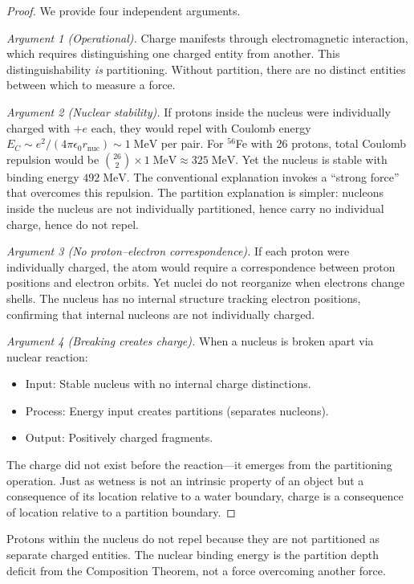 \begin{proof}
We provide four independent arguments.

\emph{Argument 1 (Operational).} Charge manifests through electromagnetic interaction, which requires distinguishing one charged entity from another. This distinguishability \emph{is} partitioning. Without partition, there are no distinct entities between which to measure a force.

\emph{Argument 2 (Nuclear stability).} If protons inside the nucleus were individually charged with $+e$ each, they would repel with Coulomb energy $E_C \sim e^2/(4\pi\epsilon_0 r_{\mathrm{nuc}}) \sim 1\;\mathrm{MeV}$ per pair. For $^{56}$Fe with 26 protons, total Coulomb repulsion would be $\binom{26}{2} \times 1\;\mathrm{MeV} \approx 325\;\mathrm{MeV}$. Yet the nucleus is stable with binding energy $492\;\mathrm{MeV}$. The conventional explanation invokes a ``strong force'' that overcomes this repulsion. The partition explanation is simpler: nucleons inside the nucleus are not individually partitioned, hence carry no individual charge, hence do not repel.

\emph{Argument 3 (No proton--electron correspondence).} If each proton were individually charged, the atom would require a correspondence between proton positions and electron orbits. Yet nuclei do not reorganize when electrons change shells. The nucleus has no internal structure tracking electron positions, confirming that internal nucleons are not individually charged.

\emph{Argument 4 (Breaking creates charge).} When a nucleus is broken apart via nuclear reaction:
\begin{itemize}
    \item Input: Stable nucleus with no internal charge distinctions.
    \item Process: Energy input creates partitions (separates nucleons).
    \item Output: Positively charged fragments.
\end{itemize}
The charge did not exist before the reaction---it emerges from the partitioning operation. Just as wetness is not an intrinsic property of an object but a consequence of its location relative to a water boundary, charge is a consequence of location relative to a partition boundary.
\end{proof}

\begin{corollary}
\label{cor:nuclear_stability}
Protons within the nucleus do not repel because they are not partitioned as separate charged entities. The nuclear binding energy is the partition depth deficit from the Composition Theorem, not a force overcoming another force.
\end{corollary}

